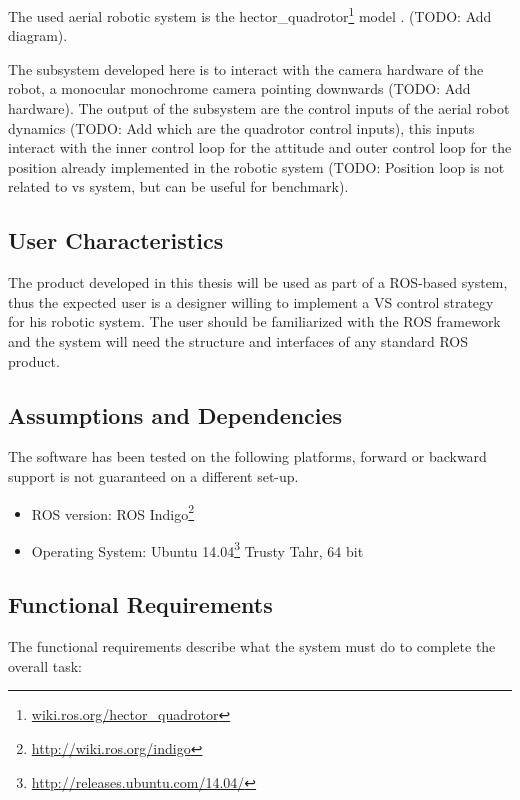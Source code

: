 The used aerial robotic system is the hector\_quadrotor\footnote{\url{wiki.ros.org/hector_quadrotor}} model \cite{2012simpar_meyer}. (TODO: Add diagram).

The subsystem developed here is to interact with the camera hardware of the robot, a monocular monochrome camera pointing downwards (TODO: Add hardware). The output of the subsystem are the control inputs of the aerial robot dynamics (TODO: Add which are the quadrotor control inputs), this inputs interact with the inner control loop for the attitude and outer control loop for the position already implemented in the robotic system (TODO: Position loop is not related to vs system, but can be useful for benchmark).

\subsection{User Characteristics}
\label{sec:user-characteristics}

The product developed in this thesis will be used as part of a ROS-based system, thus the expected user is a designer willing to implement a VS control strategy for his robotic system. The user should be familiarized with the ROS framework and the system will need the structure and interfaces of any standard ROS product.

\subsection{Assumptions and Dependencies}
\label{sec:assumptions-dependencies}

The software  has been tested on the following platforms, forward or backward support is not guaranteed on a different set-up.

\begin{itemize}
	\item ROS version: ROS Indigo\footnote{\url{http://wiki.ros.org/indigo}}
	\item Operating System: Ubuntu 14.04\footnote{\url{http://releases.ubuntu.com/14.04/}} Trusty Tahr, 64 bit
\end{itemize}

\subsection{Functional Requirements}
\label{sec:functional-requirements}

The functional requirements describe what the system must do to complete the overall task:

